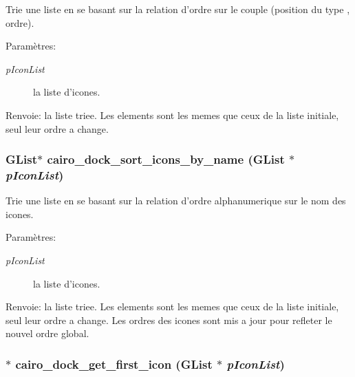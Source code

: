 Trie une liste en se basant sur la relation d'ordre sur le couple (position du type , ordre). \begin{Desc}
\item[Paramètres:]
\begin{description}
\item[{\em pIconList}]la liste d'icones. \end{description}
\end{Desc}
\begin{Desc}
\item[Renvoie:]la liste triee. Les elements sont les memes que ceux de la liste initiale, seul leur ordre a change. \end{Desc}
\subsubsection{\setlength{\rightskip}{0pt plus 5cm}GList$\ast$ cairo\_\-dock\_\-sort\_\-icons\_\-by\_\-name (GList $\ast$ {\em pIconList})}\label{cairo-dock-icons_8h_a78c3612a56f84f0e0765bd26c7510a4}


Trie une liste en se basant sur la relation d'ordre alphanumerique sur le nom des icones. \begin{Desc}
\item[Paramètres:]
\begin{description}
\item[{\em pIconList}]la liste d'icones. \end{description}
\end{Desc}
\begin{Desc}
\item[Renvoie:]la liste triee. Les elements sont les memes que ceux de la liste initiale, seul leur ordre a change. Les ordres des icones sont mis a jour pour refleter le nouvel ordre global. \end{Desc}
\subsubsection{$\ast$ cairo\_\-dock\_\-get\_\-first\_\-icon (GList $\ast$ {\em pIconList})}\label{cairo-dock-icons_8h_a33afd0fe00295cedadd9f7ef73d8b1e}


